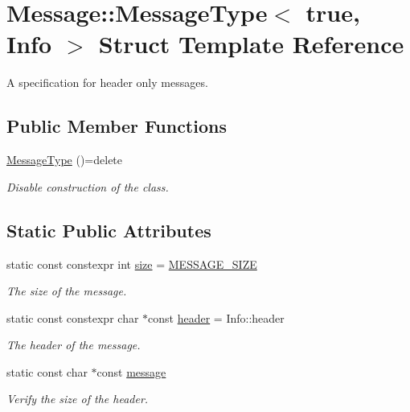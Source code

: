 \hypertarget{struct_message_1_1_message_type_3_01true_00_01_info_01_4}{}\section{Message\+:\+:Message\+Type$<$ true, Info $>$ Struct Template Reference}
\label{struct_message_1_1_message_type_3_01true_00_01_info_01_4}


A specification for header only messages.  


\subsection*{Public Member Functions}
\begin{DoxyCompactItemize}
\item 
\hyperlink{struct_message_1_1_message_type_3_01true_00_01_info_01_4_adaa3100a1ea2b1f782911d5c328ed4bb}{Message\+Type} ()=delete
\begin{DoxyCompactList}\small\item\em Disable construction of the class. \end{DoxyCompactList}\end{DoxyCompactItemize}
\subsection*{Static Public Attributes}
\begin{DoxyCompactItemize}
\item 
static const constexpr int \hyperlink{struct_message_1_1_message_type_3_01true_00_01_info_01_4_a2cc4f5dbfaba4502c6209e73836c96f1}{size} = \hyperlink{message_8hpp_aeca90e1c1c62b70670514ffc18c9dfd4}{M\+E\+S\+S\+A\+G\+E\+\_\+\+S\+I\+ZE}
\begin{DoxyCompactList}\small\item\em The size of the message. \end{DoxyCompactList}\item 
static const constexpr char $\ast$const \hyperlink{struct_message_1_1_message_type_3_01true_00_01_info_01_4_a1518832727d6d5e69c44f12f88a70783}{header} = Info\+::header
\begin{DoxyCompactList}\small\item\em The header of the message. \end{DoxyCompactList}\item 
static const char $\ast$const \hyperlink{struct_message_1_1_message_type_3_01true_00_01_info_01_4_a8ec12f51c4311bf137bc356da823255a}{message}
\begin{DoxyCompactList}\small\item\em Verify the size of the header. \end{DoxyCompactList}\end{DoxyCompactItemize}

